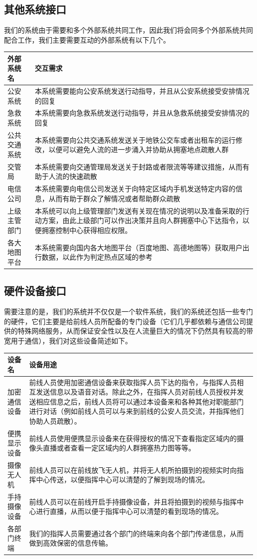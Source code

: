 \documentclass{ctexrep}
\begin{document}
\subsection{其他系统接口}
我们的系统由于需要和多个外部系统共同工作，因此我们将会同多个外部系统共同配合工作，我们主要需要互动的外部系统有以下几个。
\begin{longtable}{p{2cm}|p{10cm}}
\hline
外部系统名 & 交互需求 \\
\hline
\hline
公安系统 & 本系统需要能向公安系统发送行动指导，并且从公安系统接受安排情况的回复 \\
\hline
急救系统 & 本系统需要向急救系统发送行动指导，并且从急救系统接受安排情况的回复 \\
\hline
公共交通系统 & 本系统需要向公共交通系统发送关于地铁公交车或者出租车的运行修改，以便可以避免人流的进一步涌入并协助从拥塞地点疏散人群 \\
\hline
交管局 & 本系统需要向交通管理局发送关于封路或者限流等等建议措施，从而有助于人流的快速疏散\\
\hline
电信公司 & 本系统需要向电信公司发送关于向特定区域内手机发送特定内容的信息，从而有助于群众了解情况或者帮助群众疏散 \\
\hline
上级主管部门 & 本系统可以向上级管理部门发送有关现在情况的说明以及准备采取的行动方案，由此上级部门可以作出决策并且向人群拥塞中心下达指令，以便拥塞控制中心获得相应权限。\\
\hline
各大地图平台 & 本系统需要向国内各大地图平台（百度地图、高德地图等）获取用户出行数据，以此作为判定热点区域的参考 \\
\hline

\end{longtable}

\subsection{硬件设备接口}
需要注意的是，我们的系统并不仅仅是一个软件系统，我们的系统还包括一些专门的硬件，它们主要是给前线人员所配备的专门设备（它们几乎都依赖与通信公司提供的特殊网络服务，从而保证安全性以及在人流量巨大的情况下仍然具有较高的带宽用于通信），我们对这些设备简述如下。
\begin{longtable}{p{2cm}|p{10cm}}
\hline
设备名 & 设备用途 \\
\hline
\hline
加密通信设备 & 前线人员使用加密通信设备来获取指挥人员下达的指令，与指挥人员相互发送信息以及语音对话。除此之外，在指挥人员对前线人员授权并发送相应信息之后，前线人员将可以通过本设备来和各种其他对职能部门进行对话（例如前线人员可以与来到前线的公安人员交流，并指挥他们协助人员疏散）。 \\
\hline
便携显示设备 & 前线人员使用便携显示设备来在获得授权的情况下查看指定区域内的摄像头直播或者查看一定区域内的人群拥塞热力图等等。 \\
\hline
摄像无人机 & 前线人员可以在前线放飞无人机，并将无人机所拍摄到的视频实时向指挥中心传送，以便指挥中心可以清楚的了解到现场的情况。 \\
\hline
手持摄像设备 & 前线人员可以在前线开启手持摄像设备，并且将拍摄到的视频与指挥中心进行直播，从而以便于指挥中心可以清楚的看到现场的情况。 \\
\hline
各部门终端 & 我们的指挥人员需要通过各个部门的终端来向各个部门传递信息，从而做到高效保密的信息传输。\\
\hline
\end{longtable}
\end{document}
